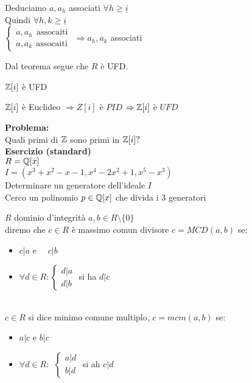\documentclass[12px]{article}
\begin{document}
\begin{dimo}
\begin{enumerate}
\begin{itemize}
				  \end{itemize}
				  Deduciamo $a, a_h$ associati $\forall h\geq \underline i$\\
				  Quindi  $\forall h,k\geq \underline i$\\
				   $ \begin{cases}
					   a,a_h \ \ \text{assocaiti}\\
					   a,a_k \ \ \text{assocaiti}
				   \end{cases}$
				   $ \Rightarrow a_h,a_k$ associati\\
		\end{enumerate}
		Dal teorema segue che $R$ è UFD.
	  \end{dimo}
	  \begin{coro}
		  $\mathbb{Z}[i]$ è UFD
	  \end{coro}
	  \begin{dimo}
		  $\mathbb{Z}[i]$ è Euclideo  $ \Rightarrow Z[i]$ è $PID$  $ \Rightarrow \mathbb{Z}[i]$ è $ UFD$
	  \end{dimo}
	  \textbf{Problema:}\\
	  Quali primi di $\mathbb{Z}$ sono primi in  $\mathbb{Z}[i]?$\\
	   \textbf{Esercizio (standard)}\\
	   $R = \mathbb{Q}[x]$\\
	    $I = (x^3 + x^2-x-1,x^4-2x^2+1,x^5-x^3)$\\
	    Determinare un generatore dell'ideale  $I$\\
	    Cerco un polinomio  $p\in\mathbb{Q}[x]$ che divida i 3 generatori\\
	     \begin{defi}
		     $R$ dominio d'integrità $a,b\in R\setminus\{0\}$ \\
		     diremo che $c\in R$ è massimo comun divisore  $c = MCD(a,b)$ se:
		      \begin{itemize}
			      \item $c| a$ e \ \ $c| b$
			      \item $\forall d\in R : \begin{cases}
			      	d|a\\
				d|b
			      \end{cases}$ si ha $d|c$
		     \end{itemize}\\
		     $c\in R$ si dice minimo comune multiplo,  $c = mcm(a,b)$ se:
		      \begin{itemize}
			      \item $a|c $ e  $b|c$
			      \item $\forall d\in R :\ \ \begin{cases}
			      	a | d \\ b | d
			      \end{cases}$ si ah $c | d $
		     \end{itemize}

	    \end{defi}
\end{document}
